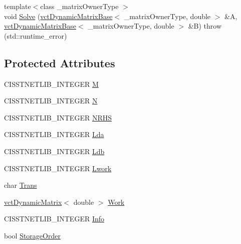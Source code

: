 {\bf }\par
\begin{DoxyCompactItemize}
\item 
{\footnotesize template$<$class \-\_\-matrix\-Owner\-Type $>$ }\\void \hyperlink{classnmr_l_s_solver_acdb3f0210b607660f85804cfce5981b9}{Solve} (\hyperlink{classvct_dynamic_matrix_base}{vct\-Dynamic\-Matrix\-Base}$<$ \-\_\-matrix\-Owner\-Type, double $>$ \&A, \hyperlink{classvct_dynamic_matrix_base}{vct\-Dynamic\-Matrix\-Base}$<$ \-\_\-matrix\-Owner\-Type, double $>$ \&B)  throw (std\-::runtime\-\_\-error)
\end{DoxyCompactItemize}

\subsection*{Protected Attributes}
\begin{DoxyCompactItemize}
\item 
C\-I\-S\-S\-T\-N\-E\-T\-L\-I\-B\-\_\-\-I\-N\-T\-E\-G\-E\-R \hyperlink{classnmr_l_s_solver_a8911bae5a933a6479875c0b3e600ad33}{M}
\item 
C\-I\-S\-S\-T\-N\-E\-T\-L\-I\-B\-\_\-\-I\-N\-T\-E\-G\-E\-R \hyperlink{classnmr_l_s_solver_a06ea8b9ad9abd90f794cdeb74c25b8f8}{N}
\item 
C\-I\-S\-S\-T\-N\-E\-T\-L\-I\-B\-\_\-\-I\-N\-T\-E\-G\-E\-R \hyperlink{classnmr_l_s_solver_a01d9ecf148cd5d9e59906b5e665af2ca}{N\-R\-H\-S}
\item 
C\-I\-S\-S\-T\-N\-E\-T\-L\-I\-B\-\_\-\-I\-N\-T\-E\-G\-E\-R \hyperlink{classnmr_l_s_solver_a91f013fd3848b399838934e9944a8b03}{Lda}
\item 
C\-I\-S\-S\-T\-N\-E\-T\-L\-I\-B\-\_\-\-I\-N\-T\-E\-G\-E\-R \hyperlink{classnmr_l_s_solver_a18e45725c1e373bccc3201e20a483fcb}{Ldb}
\item 
C\-I\-S\-S\-T\-N\-E\-T\-L\-I\-B\-\_\-\-I\-N\-T\-E\-G\-E\-R \hyperlink{classnmr_l_s_solver_a495b9cb5c8c3b62b1d12a0ba6f4e1690}{Lwork}
\item 
char \hyperlink{classnmr_l_s_solver_a55e24be3fab77ab196c264948a7e6616}{Trans}
\item 
\hyperlink{classvct_dynamic_matrix}{vct\-Dynamic\-Matrix}$<$ double $>$ \hyperlink{classnmr_l_s_solver_a4b87766126014f24e3a2dbc2c3ab3d31}{Work}
\item 
C\-I\-S\-S\-T\-N\-E\-T\-L\-I\-B\-\_\-\-I\-N\-T\-E\-G\-E\-R \hyperlink{classnmr_l_s_solver_a6d0d69c4ff841404a6be897dc17f41aa}{Info}
\item 
bool \hyperlink{classnmr_l_s_solver_a86082a8fc8b55dee2d677af9222fc7e6}{Storage\-Order}
\end{DoxyCompactItemize}


